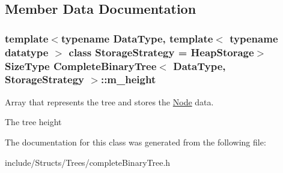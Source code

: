 \subsection{Member Data Documentation}
\hypertarget{class_complete_binary_tree_aeedb9377bd834adf4c84cdfc628048da}{
\subsubsection[{m\_\-height}]{\setlength{\rightskip}{0pt plus 5cm}template$<$typename DataType, template$<$ typename datatype $>$ class StorageStrategy = HeapStorage$>$ SizeType {\bf CompleteBinaryTree}$<$ DataType, StorageStrategy $>$::{\bf m\_\-height}}}
\label{class_complete_binary_tree_aeedb9377bd834adf4c84cdfc628048da}


Array that represents the tree and stores the \hyperlink{class_complete_binary_tree_1_1_node}{Node} data. 

The tree height 

The documentation for this class was generated from the following file:\begin{DoxyCompactItemize}
\item 
include/Structs/Trees/completeBinaryTree.h\end{DoxyCompactItemize}
